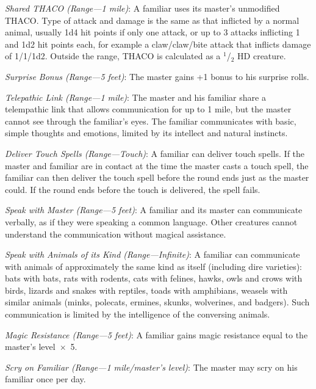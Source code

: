 \begin{multicols}{2}
\textit{Shared THACO (Range---1 mile)}: A familiar uses its master's unmodified THACO.  Type of attack and damage is the same as that inflicted by a normal animal, usually 1d4 hit points if only one attack, or up to 3 attacks inflicting 1 and 1d2 hit points each, for example a claw/claw/bite attack that inflicts damage of 1/1/1d2.  Outside the range, THACO is calculated as a $^1$/$_2$ HD creature.

\textit{Surprise Bonus (Range---5 feet)}: The master gains +1 bonus to his surprise rolls.

\textit{Telepathic Link (Range---1 mile)}: The master and his familiar share a telempathic link that allows communication for up to 1 mile, but the master cannot see through the familiar's eyes.  The familiar communicates with basic, simple thoughts and emotions, limited by its intellect and natural instincts.

\textit{Deliver Touch Spells (Range---Touch)}: A familiar can deliver touch spells.  If the master and familiar are in contact at the time the master casts a touch spell, the familiar can then deliver the touch spell before the round ends just as the master could.  If the round ends before the touch is delivered, the spell fails. 
 
\textit{Speak with Master (Range---5 feet)}: A familiar and its master can communicate verbally, as if they were speaking a common language. Other creatures cannot understand the communication without magical assistance. 

\textit{Speak with Animals of its Kind (Range---Infinite)}: A familiar can communicate with animals of approximately the same kind as itself (including dire varieties): bats with bats, rats with rodents, cats with felines, hawks, owls and crows with birds, lizards and snakes with reptiles, toads with amphibians, weasels with similar animals (minks, polecats, ermines, skunks, wolverines, and badgers).  Such communication is limited by the intelligence of the conversing animals. 

\textit{Magic Resistance (Range---5 feet)}: A familiar gains magic resistance equal to the master's level~$\times$~5. 

\textit{Scry on Familiar (Range---1 mile/master's level)}: The master may scry on his familiar once per day.

\vspace{1em}

\noindent
\begin{minipage}{\columnwidth}


\end{minipage}
\end{multicols}
